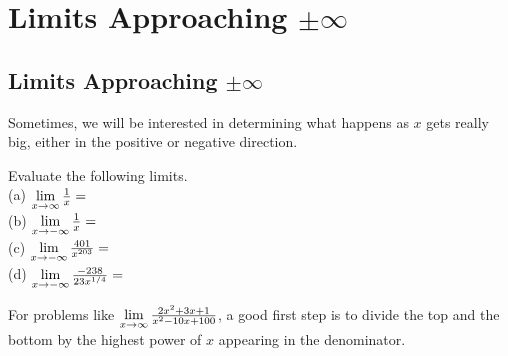 \chapter{Limits Approaching $ \pm \infty $}

\section{Limits Approaching $ \pm \infty $}

Sometimes, we will be interested in determining what happens as $ x $ gets really big, either in the positive or negative direction. \\

\begin{exercise}\nonumber
	Evaluate the following limits. \\

	(a) $ \lim\limits_{x \rightarrow \infty}{1 \over x} = $ \\

	(b) $ \lim\limits_{x \rightarrow -\infty}{1 \over x} = $ \\

	(c) $ \lim\limits_{x \rightarrow -\infty}{401 \over x^{203}} = $ \\

	(d) $ \lim\limits_{x \rightarrow -\infty}{-238 \over 23x^{1/4}} = $
\end{exercise}

For problems like $ \lim\limits_{x \rightarrow \infty}{2x^2 + 3x + 1 \over x^2 - 10x + 100} $, a good first step is to divide the top and the bottom by the highest power of $ x $ appearing in the denominator. \\

